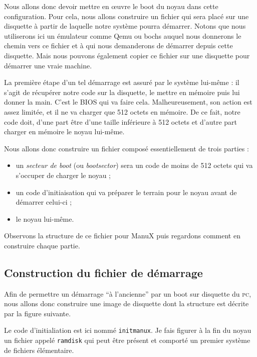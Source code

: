    Nous allons donc devoir mettre en \oe{}uvre le boot du noyau dans
cette configuration. Pour cela, nous allons construire un fichier qui
sera placé sur une disquette à partir de laquelle notre système pourra
démarrer. Notons que nous utiliserons ici un émulateur comme Qemu ou bochs
auquel nous donnerons le chemin vers ce fichier et à qui nous
demanderons de démarrer depuis cette disquette. Mais nous pouvons
également copier ce fichier sur une disquette pour démarrer une vraie
machine.

   La première étape d'un tel démarrage est assuré par le système
lui-même : il s'agit de récupérer notre code sur la disquette, le
mettre en mémoire puis lui donner la main. C'est le BIOS qui va faire
cela. Malheureusement, son action est assez limitée, et il ne va
charger que 512 octets en mémoire. De ce fait,
notre code doit, d'une part être d'une taille inférieure à 512 octets
et d'autre part charger en mémoire le noyau lui-même.

   Nous allons donc construire un fichier composé essentiellement de
trois parties :

\begin{itemize}
     \item un {\em secteur de boot} (ou {\em bootsector}) sera un code
       de moins de 512 octets qui va s'occuper de charger le noyau ;
     \item un code d'initiaisation qui va préparer le terrain pour le
       noyau avant de démarrer celui-ci ;
     \item le noyau lui-même.
\end{itemize}

   Observons la structure de ce fichier pour ManuX puis regardons comment en
construire chaque partie.

%
\subsection{Construction du fichier de démarrage}

   Afin de permettre un démarrage ``à l'ancienne'' par un boot sur
disquette du \textsc{ pc}, nous allons donc construire une image de disquette
dont la structure est décrite par la figure suivante.

   Le code d'initialiation est ici nommé {\tt initmanux}. Je fais figurer
à la fin du noyau un fichier appelé {\tt ramdisk} qui peut être
présent et comporté un premier système de fichiers élémentaire.

